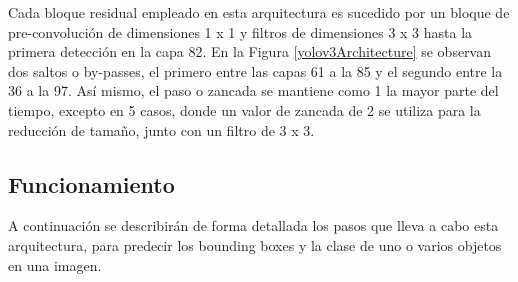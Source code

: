 Cada bloque residual empleado en esta arquitectura es sucedido por un bloque de pre-convolución de dimensiones 1 x 1 y filtros de dimensiones 3 x 3 hasta la primera detección en la capa 82. En la Figura \ref{yolov3Architecture} se observan dos saltos o by-passes, el primero entre las capas 61 a la 85 y el segundo entre la 36 a la 97. Así mismo, el paso o zancada se mantiene como 1 la mayor parte del tiempo, excepto en 5 casos, donde un valor de zancada de
2 se utiliza para la reducción de tamaño, junto con un filtro de 3 x 3.
\subsection{Funcionamiento}
A continuación se describirán de forma detallada los pasos que lleva a cabo esta arquitectura, para predecir los bounding boxes y la clase de uno o varios objetos en una imagen.
